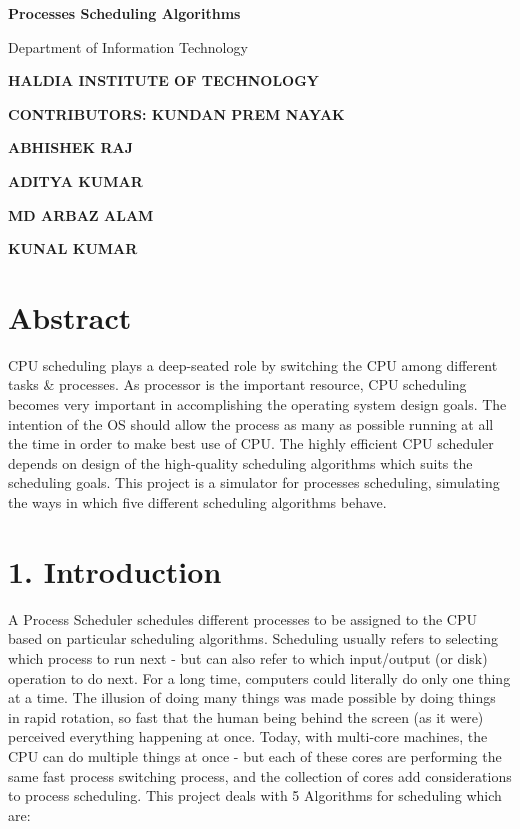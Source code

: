 \documentclass{article} %
\begin{document}


\noindent \textbf{Processes Scheduling Algorithms}

\noindent                   Department of Information Technology

\noindent \textbf{HALDIA INSTITUTE OF TECHNOLOGY}

\noindent 

\noindent                                               

\noindent \textbf{         CONTRIBUTORS:  KUNDAN PREM NAYAK}

\textbf{                 ABHISHEK RAJ}

\textbf{                 ADITYA KUMAR}

\textbf{                 MD ARBAZ ALAM}

\textbf{                 KUNAL KUMAR}

\noindent 

\noindent 

\noindent 

\noindent 

\noindent 

\noindent 


\section{ Abstract}

\noindent CPU scheduling plays a deep-seated role by switching the CPU among different tasks \& processes. As processor is the important resource, CPU scheduling becomes very important in accomplishing the operating system design goals. The intention of the OS should allow the process as many as possible running at all the time in order to make best use of CPU. The highly efficient CPU scheduler depends on design of the high-quality scheduling algorithms which suits the scheduling goals. This project is a simulator for processes scheduling, simulating the ways in which five different scheduling algorithms behave.

\noindent 


\section{ 1. Introduction}

\noindent A Process Scheduler schedules different processes to be assigned to the CPU based on particular scheduling algorithms. Scheduling usually refers to selecting which process to run next - but can also refer to which input/output (or disk) operation to do next. For a long time, computers could literally do only one thing at a time. The illusion of doing many things was made possible by doing things in rapid rotation, so fast that the human being behind the screen (as it were) perceived everything happening at once. Today, with multi-core machines, the CPU can do multiple things at once - but each of these cores are performing the same fast process switching process, and the collection of cores add considerations to process scheduling. This project deals with 5 Algorithms for scheduling which are:
\end{document}

